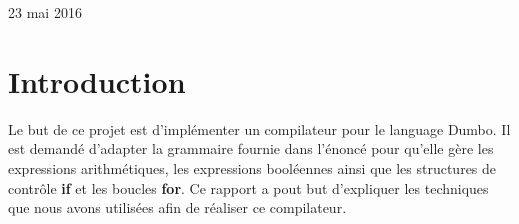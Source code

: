 \documentclass[a4paper,10pt]{article}
\begin{document}
\begin{titlepage}

{\large 23 mai 2016}\\[3cm] %


 

\vfill %

\end{titlepage}

\newpage
\tableofcontents
\newpage

\section{Introduction}
Le but de ce projet est d'implémenter un compilateur pour le language \textrm{Dumbo}. Il est demandé d'adapter la grammaire fournie dans l'énoncé pour 
qu'elle gère les expressions arithmétiques, les expressions booléennes ainsi que les structures de contrôle \textbf{if} et les boucles \textbf{for}.
Ce rapport a pout but d'expliquer les techniques que nous avons utilisées afin de réaliser ce compilateur.
\end{document}
